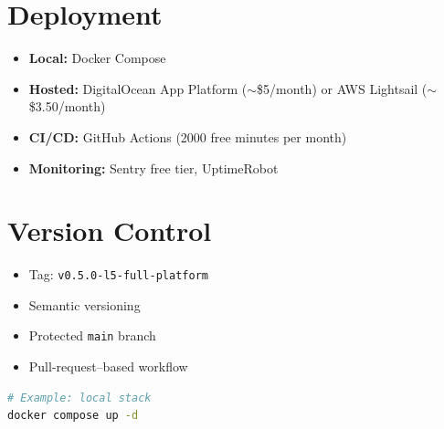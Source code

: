 \documentclass{article}
\begin{document}
\section{Deployment}

\begin{itemize}[leftmargin=*]
  \item \textbf{Local:} Docker Compose
  \item \textbf{Hosted:} DigitalOcean App Platform ($\sim$\$5/month) or AWS Lightsail ($\sim$\$3.50/month)
  \item \textbf{CI/CD:} GitHub Actions (2000 free minutes per month)
  \item \textbf{Monitoring:} Sentry free tier, UptimeRobot
\end{itemize}

\section{Version Control}

\begin{itemize}[leftmargin=*]
  \item Tag: \texttt{v0.5.0-l5-full-platform}
  \item Semantic versioning
  \item Protected \texttt{main} branch
  \item Pull-request--based workflow
\end{itemize}

\begin{lstlisting}[language=bash]
# Example: local stack
docker compose up -d
\end{lstlisting}
\end{document}
